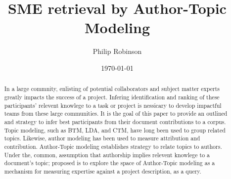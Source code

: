 \documentclass{article}
\title{SME retrieval by Author-Topic Modeling}
\date{\today}
\author{Philip Robinson}
\affil{NASA: Jet Propoultion Labratory}
\begin{document}
\maketitle

\begin{abstract}
  In a large commnity, enlisting of potential collaborators and subject matter experts
  greatly impacts the success of a project. Infering identification and ranking of
  these participants' relevent knowlege to a task or project is nessicary to develop
  impactful teams from these large communities\cite{Minto2007}. It is the goal of this
  paper to provide an outlined and strategy to infer best participants from their
  document contributions to a corpus. Topic modeling, such as BTM\cite{Yan2013}, LDA,
  and CTM, have long been used to group related topics\cite{Alghamdi2015}. Likewise,
  author modeling has been used to measure attribution\cite{Rexha2018} and
  contribution\cite{AldebeiHJ016}. Author-Topic modeling establishes strategy to
  relate topics to authors\cite{Rosen-Zvi2004}. Under the, common, assumption that
  authorship implies relevent knowlege to a document's topic; proposed is to explore
  the space of Author-Topic modeling as a mechanism for measuring expertise against a
  project description, as a query.
\end{abstract}

\end{document}
